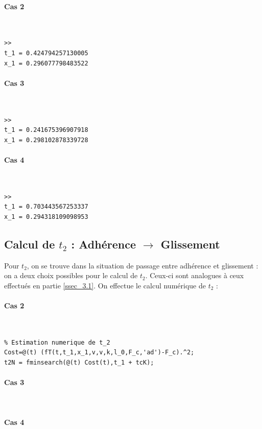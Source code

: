 \documentclass{article}
\begin{document}
\paragraph{Cas 2}
$ $ 
\begin{lstlisting}
>>
t_1 = 0.424794257130005
x_1 = 0.296077798483522
\end{lstlisting}

\paragraph{Cas 3}
$ $ 
\begin{lstlisting}
>>
t_1 = 0.241675396907918
x_1 = 0.298102878339728
\end{lstlisting}

\paragraph{Cas 4}
$ $
\begin{lstlisting}
>>
t_1 = 0.703443567253337
x_1 = 0.294318109098953
\end{lstlisting}

\subsection{Calcul de $t_2$ : Adhérence $\rightarrow$ Glissement}\label{ssec_4.2}
Pour $t_2$, on se trouve dans la situation de passage entre adhérence et glissement : on a deux choix possibles pour le calcul de $t_2$. Ceux-ci sont analogues à ceux effectués en partie \ref{ssec_3.1}. On effectue le calcul numérique de $t_2$ :

\paragraph{Cas 2}
$ $
\begin{lstlisting}
% Estimation numerique de t_2
Cost=@(t) (fT(t,t_1,x_1,v,v,k,l_0,F_c,'ad')-F_c).^2;
t2N = fminsearch(@(t) Cost(t),t_1 + tcK);
\end{lstlisting}

\paragraph{Cas 3}
$ $

\paragraph{Cas 4}
$ $
\end{document}
